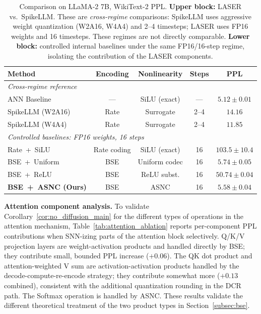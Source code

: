 \documentclass{article}
\theoremstyle{plain}
\theoremstyle{definition}
\theoremstyle{remark}
\begin{document}
\begin{table}[h!]
\centering
\caption{Comparison on LLaMA-2 7B, WikiText-2 PPL. \textbf{Upper block:} LASER
vs.\ SpikeLLM. These are \emph{cross-regime} comparisons: SpikeLLM uses aggressive
weight quantization (W2A16, W4A4) and 2--4 timesteps; LASER uses FP16 weights and
16 timesteps. These regimes are not directly comparable. \textbf{Lower block:}
controlled internal baselines under the same FP16/16-step regime, isolating the
contribution of the LASER components.}
\label{tab:comparison}
\small
\begin{tabular}{lcccc}
\toprule
\textbf{Method} & \textbf{Encoding} & \textbf{Nonlinearity} & \textbf{Steps} & \textbf{PPL} \\
\midrule
\multicolumn{5}{l}{\textit{Cross-regime reference}} \\
ANN Baseline              & ---          & SiLU (exact)    & ---  & $5.12 \pm 0.01$ \\
SpikeLLM (W2A16)          & Rate         & Surrogate       & 2--4 & $14.16$ \\
SpikeLLM (W4A4)           & Rate         & Surrogate       & 2--4 & $11.85$ \\
\midrule
\multicolumn{5}{l}{\textit{Controlled baselines: FP16 weights, 16 steps}} \\
Rate~+~SiLU               & Rate coding  & SiLU (exact)    & 16   & $103.5 \pm 10.4$ \\
BSE~+~Uniform             & BSE          & Uniform codec   & 16   & $5.74 \pm 0.05$ \\
BSE~+~ReLU                & BSE          & ReLU subst.     & 16   & $50.74 \pm 0.04$ \\
\textbf{BSE~+~ASNC (Ours)}& BSE          & ASNC            & 16   & $\mathbf{5.58 \pm 0.04}$ \\
\bottomrule
\end{tabular}
\end{table}

\noindent\textbf{Attention component analysis.}
To validate Corollary~\ref{cor:no_diffusion_main} for the different types of
operations in the attention mechanism, Table~\ref{tab:attention_ablation} reports
per-component PPL contributions when SNN-izing parts of the attention block
selectively. Q/K/V projection layers are weight-activation products and handled
directly by BSE; they contribute small, bounded PPL increase ($+0.06$). The QK
dot product and attention-weighted V sum are activation-activation products handled
by the decode-compute-re-encode strategy; they contribute somewhat more ($+0.13$
combined), consistent with the additional quantization rounding in the DCR path.
The Softmax operation is handled by ASNC. These results validate the different
theoretical treatment of the two product types in Section~\ref{subsec:bse}.
\end{document}
